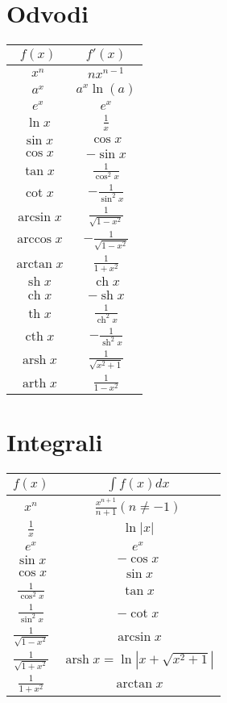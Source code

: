 \documentclass[a4paper,oneside,8pt]{extarticle}
\title{\Title}
\author{\Author}
\date{\today}
\theoremstyle{definition}
\DeclareMathOperator\ch{ch}
\DeclareMathOperator\sh{sh}
\DeclareMathOperator\Th{th}  %
\DeclareMathOperator\cth{cth}
\DeclareMathOperator\arsh{arsh}
\DeclareMathOperator\arth{arth}
\newcommand\abs[1]{\left|#1\right|}
\begin{document}
\begin{multicols}{2}
	\section*{Odvodi}
	\begin{tabular}[h]{|c|c|}
		\hline
		$f(x)$ & $f'(x)$ \\
		\hline
		$x^n$ & $nx^{n-1}$\\
		$a^x$ & $a^x\ln(a)$\\
		$e^x$ & $e^x$\\
		$\ln{x}$ & $\frac{1}{x}$\\
		$\sin{x}$ & $\cos{x}$\\
		$\cos{x}$ & $-\sin{x}$\\
		$\tan{x}$ & $\frac{1}{\cos^2{x}}$\\
		$\cot{x}$ & $-\frac{1}{\sin^2{x}}$\\
		$\arcsin{x}$ & $\frac{1}{\sqrt{1-x^2}}$\\
		$\arccos{x}$ & $-\frac{1}{\sqrt{1-x^2}}$\\
		$\arctan{x}$ & $\frac{1}{1+x^2}$\\
		$\sh{x}$ & $\ch{x}$\\
		$\ch{x}$ & $-\sh{x}$\\
		$\Th{x}$ & $\frac{1}{\ch^2{x}}$\\
		$\cth{x}$ & $-\frac{1}{\sh^2{x}}$\\
		$\arsh{x}$ & $\frac{1}{\sqrt{x^2+1}}$\\
		$\arth{x}$ & $\frac{1}{1-x^2}$\\
		\hline 
	\end{tabular}
%
	\section*{Integrali}
	\begin{tabular}[h]{|c|c|}
		\hline
		$f(x)$ & $\int f(x)dx$ \\
		\hline
		$x^n$ & $\frac{x^{n+1}}{n+1} (n \neq -1)$ \\
		$\frac{1}{x}$ & $\ln{\abs{x}}$ \\
		$e^x$ & $e^x$\\
		$\sin{x}$ & $-\cos{x}$\\
		$\cos{x}$ & $\sin{x}$\\
		$\frac{1}{\cos^2{x}}$ & $\tan{x}$\\
		$\frac{1}{\sin^2{x}}$ & $-\cot{x}$\\
		$\frac{1}{\sqrt{1-x^2}}$ & $\arcsin{x}$\\
		$\frac{1}{\sqrt{1+x^2}}$ & $\arsh{x} = \ln{\abs{x + \sqrt{x^2 + 1}}}$\\
		$\frac{1}{1+x^2}$ & $\arctan{x}$\\
		\hline 
	\end{tabular}
%

\end{multicols}
\end{document}
